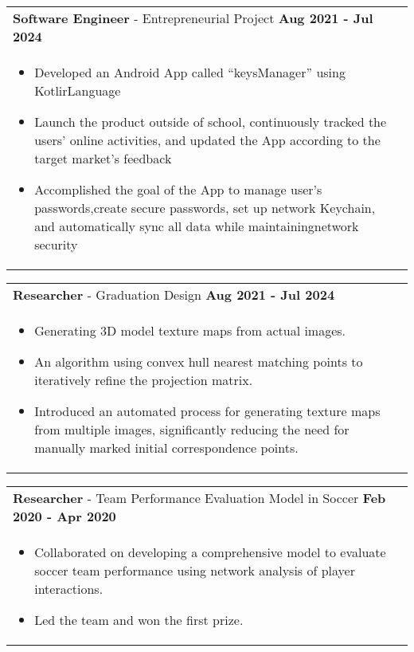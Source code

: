 \documentclass[a4paper,12pt]{article}
\begin{document}
\begin{tabularx}{\linewidth}{ @{}l r@{} }
\textbf{Software Engineer} - Entrepreneurial Project \hfill \textbf{Aug 2021 - Jul 2024} \\[4pt]
\begin{minipage}[t]{\linewidth}
    \begin{itemize}[nosep,after=\strut, leftmargin=1em, itemsep=2pt]
        \item Developed an Android App called “keysManager” using KotlirLanguage
        \item Launch the product outside of school, continuously tracked the users' online activities, and updated the
        App according to the target market's feedback
        \item Accomplished the goal of the App to manage user's passwords,create secure passwords, set up network
        Keychain, and automatically sync all data while maintainingnetwork security
    \end{itemize}
\end{minipage}
\end{tabularx}

\begin{tabularx}{\linewidth}{ @{}l r@{} }
\textbf{Researcher} - Graduation Design \hfill \textbf{Aug 2021 - Jul 2024} \\[4pt]
\begin{minipage}[t]{\linewidth}
    \begin{itemize}[nosep,after=\strut, leftmargin=1em, itemsep=2pt]
        \item Generating 3D model texture maps from actual images.
        \item An algorithm using convex hull nearest matching points to iteratively refine the projection matrix.
        \item Introduced an automated process for generating texture maps from multiple images, significantly reducing the need for manually marked initial correspondence points.
    \end{itemize}
\end{minipage}
\end{tabularx}

\begin{tabularx}{\linewidth}{ @{}l r@{} }
    \textbf{Researcher} - Team Performance Evaluation Model in Soccer \hfill \textbf{Feb 2020 - Apr 2020} \\[4pt]
    \begin{minipage}[t]{\linewidth}
        \begin{itemize}[nosep,after=\strut, leftmargin=1em, itemsep=2pt]
            \item Collaborated on developing a comprehensive model to evaluate soccer team performance using network analysis of player interactions.
            \item Led the team and won the first prize.
        \end{itemize}
    \end{minipage}
    \end{tabularx}
\end{document}
